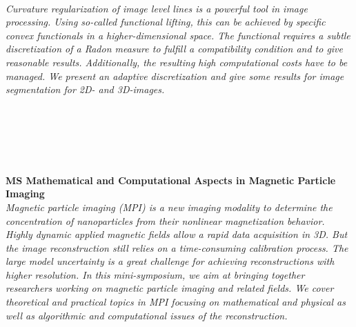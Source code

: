 \begin{multicols}{2}
\\
      \textit{Curvature regularization of image level lines is a powerful tool in image processing. Using so-called functional lifting, this can be achieved by specific convex functionals in a higher-dimensional space. The functional requires a subtle discretization of a Radon measure to fulfill a compatibility condition and to give reasonable results. Additionally, the resulting high computational costs have to be managed. We present an adaptive discretization and give some results for image segmentation for 2D- and 3D-images.}\\
\\ 
        \\
        \\\\
\\
\end{multicols}
  \noindent\textbf{MS Mathematical and Computational Aspects in Magnetic Particle Imaging}\\
  \textit{Magnetic particle imaging (MPI) is a new imaging modality to determine the concentration of nanoparticles from their nonlinear magnetization behavior. Highly dynamic applied magnetic fields allow a rapid data acquisition in 3D. But the image reconstruction still relies on a time-consuming calibration process. The large model uncertainty is a great challenge for achieving reconstructions with higher resolution. In this mini-symposium, we aim at bringing together researchers working on magnetic particle imaging and related fields. We cover theoretical and practical topics in MPI focusing on mathematical and physical as well as algorithmic and computational issues of the reconstruction.} \\
    
